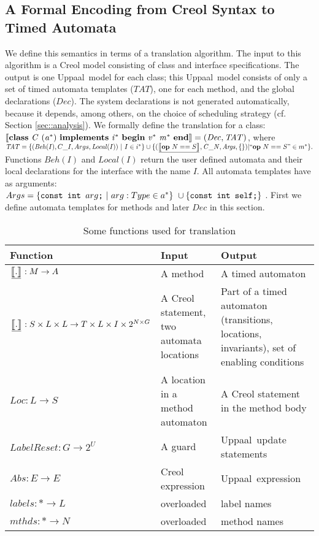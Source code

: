 \documentclass[copyright,creativecommons]{eptcs}
\theoremstyle{definition}
\newcommand{\id}[1]{\mathit{#1}}
\newcommand{\Uppaal}{{\sc Uppaal}\xspace}
\newcommand{\trule}[1]{\big[\hspace{-.1cm}\underline{\big[#1\big]}\hspace{-.1cm}\big]}
\begin{document}
\subsection{A Formal Encoding from Creol Syntax to Timed Automata}
\label{sec:formal}

We define this semantics in terms of a translation algorithm.
The input to this algorithm is a Creol model consisting of class and interface specifications.
The output is one \Uppaal\ model for each class; this \Uppaal\ model consists of only a set of timed automata templates ($\id{TAT}$), one for each method, and the global declarations ($\id{Dec}$).
The system declarations is not generated automatically, because it depends, among others, on the choice of scheduling strategy (cf. Section \ref {sec::analysis}).
We formally define the translation for a class: $[\![  \id{\bf class} ~ \id{C}~( \id{a^*})~ \id{\bf implements}~ \id{i^*} ~ \id{\bf begin} ~\id{v^*} ~\id{m^*} ~\id{\bf end}  ]\!] = (\id{Dec}, \id{TAT})$, where
{\small
\begin{math}
\id{TAT} = \{ (\id{Beh}(I), C\_I, Args,\id{Local}(I)) ~|~ I \in i^*\} \cup
\{(\trule{\id{\bf op}~ N == S}, \id{C\_N}, \id{Args}, \{\})
| ``\id{\bf op}~ N == S\mbox{''} \in m^*\}.
\end{math}
}
Functions $\id{Beh}(I)$ and $\id{Local}(I)$ return the user defined automata and their local declarations for the interface with the name $I$.
All automata templates have as arguments:
{\small
$
Args =  \{ \verb+const int + arg \verb+;+~|~arg:Type \in a^* \} ~ \cup
 \{ \verb+const int self;+ \}
$
}.
First we define automata templates for methods and later $\id{Dec}$ in this section.


\begin{table}
{\small
\begin{tabular}{@{}p{.19\linewidth}|p{.33\linewidth}|p{.40\linewidth}}
Function & Input & Output \\ \hline
$\trule{.}: M \rightarrow A$ & A method & A timed automaton \\ \hline
$\trule{.}: S \times L \times L \rightarrow T \times L \times I \times 2^{N \times G}$ &   A  Creol statement, two automata locations &
Part of a timed automaton (transitions, locations, invariants), set of enabling conditions \\\hline
$\id{Loc}: L \rightarrow S $&  A location in a method automaton & A Creol statement in the method body \\\hline
$\id{LabelReset}: G \rightarrow 2^U $ & A guard & \Uppaal\ update statements\\\hline
$\id{Abs}: E \rightarrow E$ & Creol expression & \Uppaal\ expression\\ \hline
$\id{labels}:  * \rightarrow L $ & overloaded & label names \\ \hline
$\id{mthds}: * \rightarrow N$ & overloaded & method names  \\
\end{tabular}
}
\caption{Some functions used for translation}
\label{tab:function}
\end{table}
\end{document}

